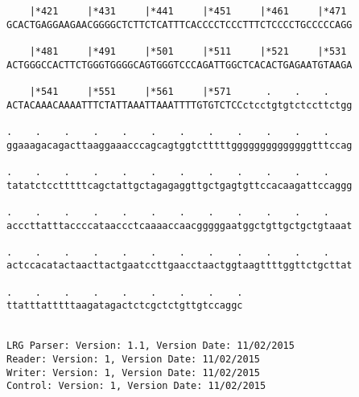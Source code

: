 \documentclass{article}
\begin{document}
\begin{Verbatim}
    |*421     |*431     |*441     |*451     |*461     |*471 
GCACTGAGGAAGAACGGGGCTCTTCTCATTTCACCCCTCCCTTTCTCCCCTGCCCCCAGG
                                                            
    |*481     |*491     |*501     |*511     |*521     |*531 
ACTGGGCCACTTCTGGGTGGGGCAGTGGGTCCCAGATTGGCTCACACTGAGAATGTAAGA
                                                            
    |*541     |*551     |*561     |*571      .    .    .    
ACTACAAACAAAATTTCTATTAAATTAAATTTTGTGTCTCCctcctgtgtctccttctgg
                                                            
.    .    .    .    .    .    .    .    .    .    .    .    
ggaaagacagacttaaggaaacccagcagtggtctttttggggggggggggggtttccag
                                                            
.    .    .    .    .    .    .    .    .    .    .    .    
tatatctcctttttcagctattgctagagaggttgctgagtgttccacaagattccaggg
                                                            
.    .    .    .    .    .    .    .    .    .    .    .    
acccttatttaccccataaccctcaaaaccaacgggggaatggctgttgctgctgtaaat
                                                            
.    .    .    .    .    .    .    .    .    .    .    .    
actccacatactaacttactgaatccttgaacctaactggtaagttttggttctgcttat
                                                            
.    .    .    .    .    .    .    .    .
ttatttatttttaagatagactctcgctctgttgtccaggc
                                         
                                         
LRG Parser: Version: 1.1, Version Date: 11/02/2015
Reader: Version: 1, Version Date: 11/02/2015
Writer: Version: 1, Version Date: 11/02/2015
Control: Version: 1, Version Date: 11/02/2015
\end{Verbatim}
\end{document}
